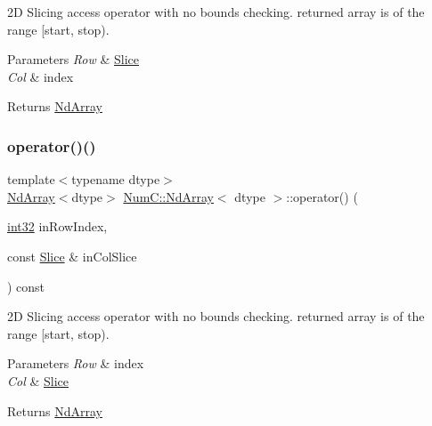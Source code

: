 2D Slicing access operator with no bounds checking. returned array is of the range \mbox{[}start, stop).


\begin{DoxyParams}{Parameters}
{\em Row} & \mbox{\hyperlink{class_num_c_1_1_slice}{Slice}} \\
\hline
{\em Col} & index \\
\hline
\end{DoxyParams}
\begin{DoxyReturn}{Returns}
\mbox{\hyperlink{class_num_c_1_1_nd_array}{Nd\+Array}} 
\end{DoxyReturn}
\mbox{\label{class_num_c_1_1_nd_array_a6f395ba86e934cc3291c6dbb1f89c13e}} 
\subsubsection{\texorpdfstring{operator()()}{operator()()}\hspace{0.1cm}{\footnotesize\ttfamily [5/5]}}
{\footnotesize\ttfamily template$<$typename dtype$>$ \\
\mbox{\hyperlink{class_num_c_1_1_nd_array}{Nd\+Array}}$<$dtype$>$ \mbox{\hyperlink{class_num_c_1_1_nd_array}{Num\+C\+::\+Nd\+Array}}$<$ dtype $>$\+::operator() (\begin{DoxyParamCaption}\item[{\mbox{\hyperlink{namespace_num_c_aa5a7e69266097d55816d4cdb19542b53}{int32}}}]{in\+Row\+Index,  }\item[{const \mbox{\hyperlink{class_num_c_1_1_slice}{Slice}} \&}]{in\+Col\+Slice }\end{DoxyParamCaption}) const\hspace{0.3cm}{\ttfamily [inline]}}

2D Slicing access operator with no bounds checking. returned array is of the range \mbox{[}start, stop).


\begin{DoxyParams}{Parameters}
{\em Row} & index \\
\hline
{\em Col} & \mbox{\hyperlink{class_num_c_1_1_slice}{Slice}} \\
\hline
\end{DoxyParams}
\begin{DoxyReturn}{Returns}
\mbox{\hyperlink{class_num_c_1_1_nd_array}{Nd\+Array}} 
\end{DoxyReturn}
\mbox{\label{class_num_c_1_1_nd_array_a7c3d42b830320dfd322e71757cb7e001}} 
